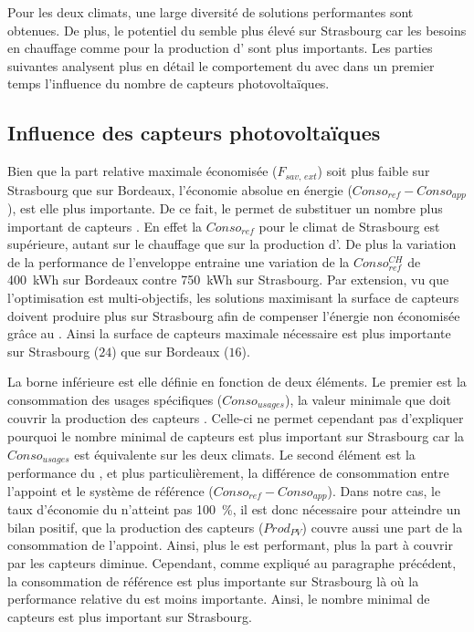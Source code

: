 Pour les deux climats, une large diversité de solutions performantes sont obtenues.
De plus, le potentiel du  semble plus élevé sur Strasbourg car les besoins
en chauffage comme pour la production d’ sont plus importants.
Les parties suivantes analysent plus en détail le comportement du  avec dans un
premier temps l’influence du nombre de capteurs photovoltaïques.



\subsection{Influence des capteurs photovoltaïques} %
\label{sub:influence_des_capteurs_photovoltaiques}
Bien que la part relative maximale économisée ($F_{sav,\,ext}$) soit plus faible sur
Strasbourg que sur Bordeaux, l’économie absolue en énergie ($Conso_{ref} - Conso_{app}$),
est elle plus importante. De ce fait, le  permet de substituer un nombre plus important de
capteurs . En effet la $Conso_{ref}$ pour le climat de Strasbourg est supérieure,
autant sur le chauffage que sur la production d’. De plus la variation de la
performance de l’enveloppe entraine une variation de la $Conso_{ref}^{CH}$ de
\SI{400}{kWh} sur Bordeaux contre \SI{750}{kWh} sur Strasbourg. Par extension, vu que
l’optimisation est multi-objectifs, les solutions maximisant la surface de capteurs
 doivent produire plus sur Strasbourg afin de compenser l’énergie non économisée
grâce au . Ainsi la surface de capteurs  maximale nécessaire est plus
importante sur Strasbourg ($24$) que sur Bordeaux ($16$).

La borne inférieure est elle définie en fonction de deux éléments. Le premier est la
consommation des usages spécifiques ($Conso_{usages}$), la valeur minimale que doit
couvrir la production des capteurs . Celle-ci ne permet cependant pas d’expliquer
pourquoi le nombre minimal de capteurs  est plus important sur Strasbourg car la
$Conso_{usages}$ est équivalente sur les deux climats. Le second élément est la
performance du , et plus particulièrement, la différence de consommation entre
l’appoint et le système de référence ($Conso_{ref} - Conso_{app}$). Dans notre cas, le
taux d’économie du  n’atteint pas \SI{100}{\percent}, il est donc nécessaire pour
atteindre un bilan positif, que la production des capteurs  ($Prod_{PV}$) couvre
aussi une part de la consommation de l’appoint. Ainsi, plus le  est performant,
plus la part à couvrir par les capteurs  diminue. Cependant, comme expliqué au
paragraphe précédent, la consommation de référence est plus importante sur Strasbourg là
où la performance relative du  est moins importante. Ainsi, le nombre minimal de
capteurs  est plus important sur Strasbourg.

